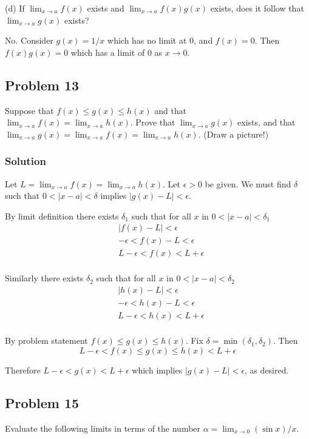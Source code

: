 \vs

(d) If $\lim_{x\to a}f(x)$ exists and $\lim_{x\to a}f(x)g(x)$ exists, does it follow that $\lim_{x\to a}g(x)$ exists?

\vs

No. Consider $g(x)=1/x$ which has no limit at $0$, and $f(x)=0$. Then $f(x)g(x)=0$ which has a limit of $0$ as $x\to 0$.

\subsection*{Problem 13}
Suppose that $f(x)\leq g(x)\leq h(x)$ and that $\lim_{x\to a}f(x)=\lim_{x\to a} h(x)$. Prove that $\lim_{x\to a}g(x)$ exists, and that $\lim_{x\to a}g(x)=\lim_{x\to a}f(x)=\lim_{x\to a} h(x)$. (Draw a picture!)

\subsubsection*{Solution}
Let $L=\lim_{x\to a}f(x)=\lim_{x\to a} h(x)$. Let $\epsilon>0$ be given. We must find $\delta$ such that $0<|x-a|<\delta$ implies $|g(x)-L|<\epsilon$.

\vs

By limit definition there exists $\delta_1$ such that for all $x$ in $0<|x-a|<\delta_1$
\begin{align*}
    &|f(x)-L|<\epsilon\\
    &-\epsilon<f(x)-L<\epsilon\\
    &L-\epsilon<f(x)<L+\epsilon\\
\end{align*}

Similarly there exists $\delta_2$ such that for all $x$ in $0<|x-a|<\delta_2$
\begin{align*}
    &|h(x)-L|<\epsilon\\
    &-\epsilon<h(x)-L<\epsilon\\
    &L-\epsilon<h(x)<L+\epsilon\\
\end{align*}

By problem statement $f(x)\leq g(x)\leq h(x)$. Fix $\delta=\min(\delta_1, \delta_2)$. Then
\[L-\epsilon<f(x)\leq g(x)\leq h(x)<L+\epsilon\]

Therefore $L-\epsilon<g(x)<L+\epsilon$ which implies $|g(x)-L|<\epsilon$, as desired.

\subsection*{Problem 15}
Evaluate the following limits in terms of the number $\alpha=\lim_{x\to0}(\sin x)/x$.

